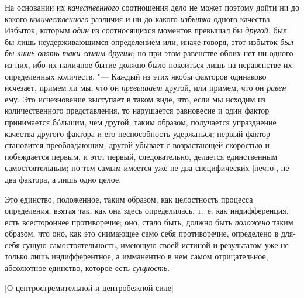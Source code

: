 На основании их {\em качественного} соотношения дело не
может поэтому дойти ни до какого {\em количественного}
различия и ни до какого {\em избытка} одного качества.
Избыток, которым {\em один} из соотносящихся моментов
превышал бы {\em другой}, был бы лишь неудерживающимся
определением или, иначе говоря, этот избыток {\em был
бы лишь опять-таки самим другим}; но при этом равенстве обоих нет ни одного
из них, ибо их наличное бытие должно было покоиться лишь на неравенстве их
определенных количеств. "--- Каждый из этих якобы факторов одинаково исчезает,
примем ли мы, что он {\em превышает} другой, или
примем, что он {\em равен} ему. Это исчезновение
выступает в таком виде, что, если мы исходим из количественного
представления, то нарушается равновесие и один фактор принимается бóльшим,
чем другой; таким образом, получается упразднение качества другого фактора
и его неспособность удержаться; первый фактор становится преобладающим,
другой убывает с возрастающей скоростью и побеждается первым, и этот
первый, следовательно, делается единственным самостоятельным; но тем самым
имеется уже не два специфических [нечто], не два фактора, а лишь одно
целое.

Это единство, положенное, таким образом, как целостность процесса
определения, взятая так, как она здесь определилась, т.~е. как
индифференция, есть всестороннее противоречие; оно, стало быть, должно быть
{\em положено} таким образом, что оно, как это
снимающее само себя противоречие, определено в для-себя-сущую
самостоятельность, имеющую своей истиной и результатом уже не только лишь
индифферентное, а имманентно в нем самом отрицательное, абсолютное единство,
которое есть {\em сущность}.

%
  {[О центростремительной и центробежной силе]}

